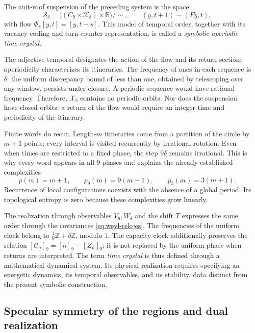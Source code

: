 \begin{definition}
\label{mono-ampl:def-cristal}
The unit-roof suspension of the preceding system is the space
\[
 \mathcal S_\delta=
 \bigl((C_9\times\mathcal X_\delta)\times\mathbb R\bigr)/\sim,
 \qquad (y,t+1)\sim(Fy,t),
\]
with flow \(\Phi_s[y,t]=[y,t+s]\). This model of temporal order,
together with its vacancy coding and turn-counter representation,
is called a \emph{symbolic aperiodic time crystal}.
\end{definition}

The adjective temporal designates the action of the flow and its return section;
aperiodicity characterizes its itineraries. The frequency of ones in each
sequence is \(\delta\): the uniform discrepancy bound of less than one,
obtained by telescoping over any window, persists under closure.
A periodic sequence would have rational frequency. Therefore,
\(\mathcal X_\delta\) contains no periodic orbits. Nor does the suspension
have closed orbits: a return of the flow would require an integer
time and periodicity of the itinerary.

Finite words do recur. Length-\(m\) itineraries
come from a partition of the circle by \(m+1\) points; every
interval is visited recurrently by irrational rotation. Even
when times are restricted to a fixed phase, the step \(9\delta\) remains
irrational. This is why every word appears in all
\(9\) phases and explains the already established complexities
\[
 p(m)=m+1,\qquad p_9(m)=9(m+1),\qquad p_3(m)=3(m+1).
\]
Recurrence of local configurations coexists with the absence of a
global period. Its topological entropy is zero because these complexities
grow linearly.

The realization through observables \(V_9,W_\delta\) and the shift
\(T\) expresses the same order through the covariances
\eqref{eq:weyl-relojes}. The frequencies of the uniform clock belong to
\(\frac19\mathbb Z+\delta\mathbb Z\), modulo \(1\). The capacity
clock additionally preserves the relation
\([\mathcal C_n]_9=[n]_9-[Z_n]_9\); it is not replaced by the uniform phase
when returns are interpreted. The term \emph{time crystal} is thus
defined through a mathematical dynamical system. Its physical realization
requires specifying an energetic dynamics, its temporal observables,
and its stability, data distinct from the present symbolic construction.

\subsection{Specular symmetry of the regions and dual realization}
\label{mono-ampl:regiones}

